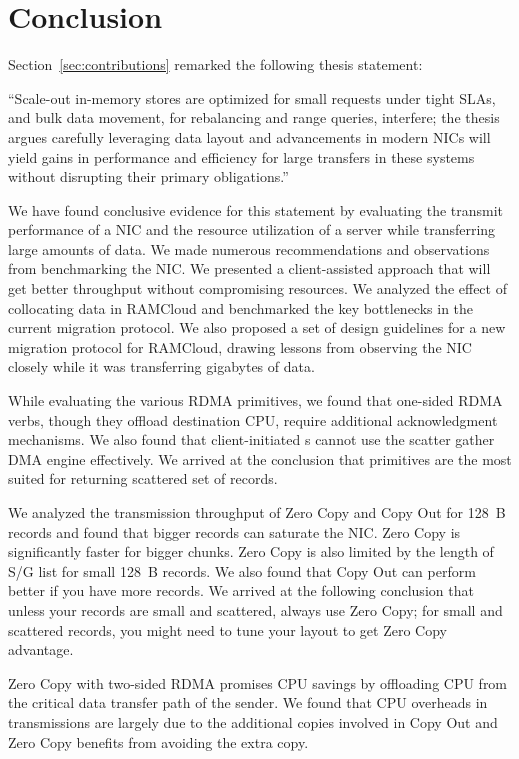 
\chapter{Conclusion}
\label{chap:conclusion}
Section~\ref{sec:contributions} remarked the following thesis statement:

``Scale-out in-memory stores are optimized for small requests
under tight SLAs, and bulk data movement, for rebalancing and range queries, interfere;
the thesis argues \linebreak carefully leveraging data layout and advancements in modern NICs
will yield gains in performance and efficiency for large transfers in these systems
without disrupting their primary obligations.''
 

We have found conclusive evidence for this statement by evaluating the transmit performance 
of a NIC and the resource utilization of a server while transferring large amounts of data. We 
made numerous recommendations and observations from benchmarking the NIC. We presented a client-assisted 
approach that will get better throughput without compromising resources. We analyzed the effect of collocating
data in RAMCloud and benchmarked the key bottlenecks in the current migration protocol. We also proposed a set of design 
guidelines for a new migration protocol for RAMCloud, drawing lessons from observing the NIC closely while it was 
transferring gigabytes of data. 

While evaluating the various RDMA primitives, we found that one-sided RDMA verbs, though they offload destination CPU, 
require additional acknowledgment mechanisms. We also found that client-initiated s cannot use the 
scatter gather DMA engine effectively. We arrived at the conclusion that  primitives 
are the most suited for returning scattered set of records.

We analyzed the transmission throughput of Zero Copy and Copy Out for 128~B records and found that bigger records can saturate the NIC.
Zero Copy is significantly faster for bigger chunks. Zero Copy is also limited by the length of S/G list for small 128~B records.
We also found that Copy Out can perform better if you have more records. We arrived at the following conclusion that 
unless your records are small and scattered, always use Zero Copy; for small and scattered records, you might need to tune your layout 
to get Zero Copy advantage.

Zero Copy with two-sided RDMA promises CPU savings by offloading CPU from the critical data transfer path of the sender. We found that 
CPU overheads in transmissions are largely due to the additional copies involved in Copy Out and Zero Copy benefits from avoiding the extra copy.
 
